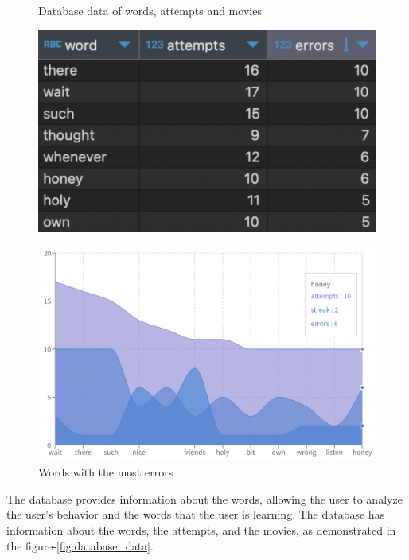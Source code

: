 \documentclass[12pt]{article}
\begin{document}
\begin{frame}{}
  \begin{figure}[!h]
      \begin{minipage}[b]{0.5\linewidth}
        \centering
        \caption{
        Database data of words, attempts and movies
        }
        \label{fig:database_data}
        \includegraphics[width=1\textwidth]{assets/32.png}
      \end{minipage}
      \hspace{0.1cm}
      \begin{minipage}[b]{0.5\linewidth}

        \centering
        \caption{
        Words with the most errors
        }
        \label{fig:database_errors}
        \includegraphics[width=1\textwidth]{assets/30.png}
       \end{minipage}
  \end{figure}
\end{frame}
The database provides information about the words, allowing the user to analyze the user's behavior and the words that the user is learning. The database has information about the words, the attempts, and the movies, as demonstrated in the figure-\ref{fig:database_data}. 
\end{document}
